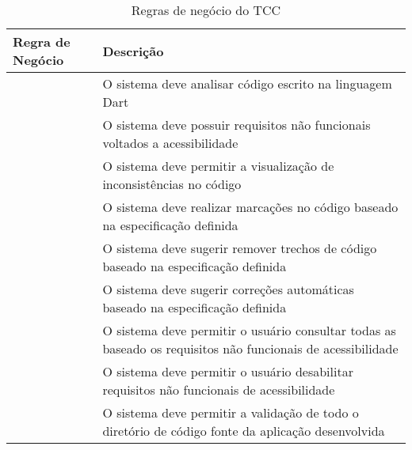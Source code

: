 \begin{table}[!htbp]
	\centering
	\renewcommand{\arraystretch}{1.1}
	\caption{Regras de negócio do TCC}
	\label{tab:tabela-regras-de-negocio}
	\begin{tabular}{ L{2cm}  L{12cm} }
		\hline
		Regra de Negócio & Descrição \\
		\hline
		\thern	& O sistema deve analisar código escrito na linguagem Dart \\
    \thern	& O sistema deve possuir requisitos não funcionais voltados a acessibilidade \\
    \thern	& O sistema deve permitir a visualização de inconsistências no código \\
    \thern	& O sistema deve realizar marcações no código baseado na especificação definida \\
    \thern	& O sistema deve sugerir remover trechos de código baseado na especificação definida \\
    \thern	& O sistema deve sugerir correções automáticas baseado na especificação definida \\
    \thern	& O sistema deve permitir o usuário consultar todas as baseado os requisitos não funcionais de acessibilidade \\
    \thern	& O sistema deve permitir o usuário desabilitar requisitos não funcionais de acessibilidade \\
    \thern	& O sistema deve permitir a validação de todo o diretório de
    código fonte da aplicação desenvolvida \\
		\hline
	\end{tabular}
	\vspace{2mm}
\end{table}